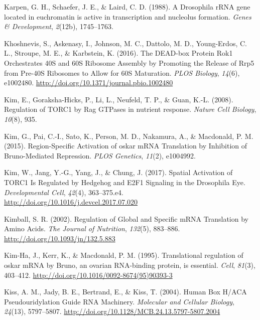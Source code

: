 \documentclass[12pt,twoside]{reedthesis}
\newlength{\cslhangindent}
\newenvironment{cslreferences}%
  {\setlength{\parindent}{0pt}%
  \everypar{\setlength{\hangindent}{\cslhangindent}}\ignorespaces}%
  {\par}
\begin{document}
\begin{cslreferences}
\leavevmode\hypertarget{ref-Karpen1988a}{}%
Karpen, G. H., Schaefer, J. E., \& Laird, C. D. (1988). A Drosophila rRNA gene located in euchromatin is active in transcription and nucleolus formation. \emph{Genes \& Development}, \emph{2}(12b), 1745--1763.

\leavevmode\hypertarget{ref-khoshnevisDEADboxProteinRok12016}{}%
Khoshnevis, S., Askenasy, I., Johnson, M. C., Dattolo, M. D., Young-Erdos, C. L., Stroupe, M. E., \& Karbstein, K. (2016). The DEAD-box Protein Rok1 Orchestrates 40S and 60S Ribosome Assembly by Promoting the Release of Rrp5 from Pre-40S Ribosomes to Allow for 60S Maturation. \emph{PLOS Biology}, \emph{14}(6), e1002480. \url{http://doi.org/10.1371/journal.pbio.1002480}

\leavevmode\hypertarget{ref-Kim2008b}{}%
Kim, E., Goraksha-Hicks, P., Li, L., Neufeld, T. P., \& Guan, K.-L. (2008). Regulation of TORC1 by Rag GTPases in nutrient response. \emph{Nature Cell Biology}, \emph{10}(8), 935.

\leavevmode\hypertarget{ref-Kim2015m}{}%
Kim, G., Pai, C.-I., Sato, K., Person, M. D., Nakamura, A., \& Macdonald, P. M. (2015). Region-Specific Activation of oskar mRNA Translation by Inhibition of Bruno-Mediated Repression. \emph{PLOS Genetics}, \emph{11}(2), e1004992.

\leavevmode\hypertarget{ref-kimSpatialActivationTORC12017}{}%
Kim, W., Jang, Y.-G., Yang, J., \& Chung, J. (2017). Spatial Activation of TORC1 Is Regulated by Hedgehog and E2F1 Signaling in the Drosophila Eye. \emph{Developmental Cell}, \emph{42}(4), 363--375.e4. \url{http://doi.org/10.1016/j.devcel.2017.07.020}

\leavevmode\hypertarget{ref-kimballRegulationGlobalSpecific2002}{}%
Kimball, S. R. (2002). Regulation of Global and Specific mRNA Translation by Amino Acids. \emph{The Journal of Nutrition}, \emph{132}(5), 883--886. \url{http://doi.org/10.1093/jn/132.5.883}

\leavevmode\hypertarget{ref-Kim-Ha1995i}{}%
Kim-Ha, J., Kerr, K., \& Macdonald, P. M. (1995). Translational regulation of oskar mRNA by Bruno, an ovarian RNA-binding protein, is essential. \emph{Cell}, \emph{81}(3), 403--412. \url{http://doi.org/10.1016/0092-8674(95)90393-3}

\leavevmode\hypertarget{ref-Kiss2004c}{}%
Kiss, A. M., Jady, B. E., Bertrand, E., \& Kiss, T. (2004). Human Box H/ACA Pseudouridylation Guide RNA Machinery. \emph{Molecular and Cellular Biology}, \emph{24}(13), 5797--5807. \url{http://doi.org/10.1128/MCB.24.13.5797-5807.2004}


\end{cslreferences}
\end{document}
